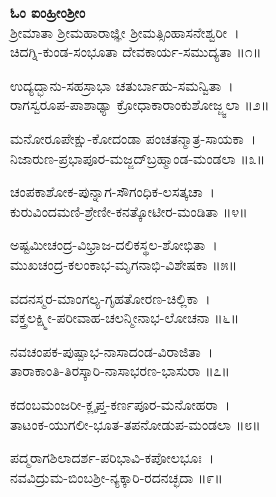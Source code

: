
{\bfseries ಓಂ ಐಂಹ್ರೀಂಶ್ರೀಂ}\\
ಶ್ರೀಮಾತಾ ಶ್ರೀಮಹಾರಾಜ್ಞೀ ಶ್ರೀಮತ್ಸಿಂಹಾಸನೇಶ್ವರೀ~।\\
ಚಿದಗ್ನಿ-ಕುಂಡ-ಸಂಭೂತಾ ದೇವಕಾರ್ಯ-ಸಮುದ್ಯತಾ ॥೧॥

ಉದ್ಯದ್ಭಾನು-ಸಹಸ್ರಾಭಾ ಚತುರ್ಬಾಹು-ಸಮನ್ವಿತಾ~।\\
ರಾಗಸ್ವರೂಪ-ಪಾಶಾಢ್ಯಾ ಕ್ರೋಧಾಕಾರಾಂಕುಶೋಜ್ಜ್ವಲಾ ॥೨॥

ಮನೋರೂಪೇಕ್ಷು-ಕೋದಂಡಾ ಪಂಚತನ್ಮಾತ್ರ-ಸಾಯಕಾ~।\\
ನಿಜಾರುಣ-ಪ್ರಭಾಪೂರ-ಮಜ್ಜದ್‍ಬ್ರಹ್ಮಾಂಡ-ಮಂಡಲಾ ॥೩॥

ಚಂಪಕಾಶೋಕ-ಪುನ್ನಾಗ-ಸೌಗಂಧಿಕ-ಲಸತ್ಕಚಾ~।\\
ಕುರುವಿಂದಮಣಿ-ಶ್ರೇಣೀ-ಕನತ್ಕೋಟೀರ-ಮಂಡಿತಾ ॥೪॥

ಅಷ್ಟಮೀಚಂದ್ರ-ವಿಭ್ರಾಜ-ದಲಿಕಸ್ಥಲ-ಶೋಭಿತಾ~।\\
ಮುಖಚಂದ್ರ-ಕಲಂಕಾಭ-ಮೃಗನಾಭಿ-ವಿಶೇಷಕಾ ॥೫॥

ವದನಸ್ಮರ-ಮಾಂಗಲ್ಯ-ಗೃಹತೋರಣ-ಚಿಲ್ಲಿಕಾ~।\\
ವಕ್ತ್ರಲಕ್ಷ್ಮೀ-ಪರೀವಾಹ-ಚಲನ್ಮೀನಾಭ-ಲೋಚನಾ ॥೬॥

ನವಚಂಪಕ-ಪುಷ್ಪಾಭ-ನಾಸಾದಂಡ-ವಿರಾಜಿತಾ~।\\
ತಾರಾಕಾಂತಿ-ತಿರಸ್ಕಾರಿ-ನಾಸಾಭರಣ-ಭಾಸುರಾ ॥೭॥

ಕದಂಬಮಂಜರೀ-ಕ್ಲೃಪ್ತ-ಕರ್ಣಪೂರ-ಮನೋಹರಾ~।\\
ತಾಟಂಕ-ಯುಗಲೀ-ಭೂತ-ತಪನೋಡುಪ-ಮಂಡಲಾ ॥೮॥

ಪದ್ಮರಾಗಶಿಲಾದರ್ಶ-ಪರಿಭಾವಿ-ಕಪೋಲಭೂಃ~।\\
ನವವಿದ್ರುಮ-ಬಿಂಬಶ್ರೀ-ನ್ಯಕ್ಕಾರಿ-ರದನಚ್ಛದಾ ॥೯॥

